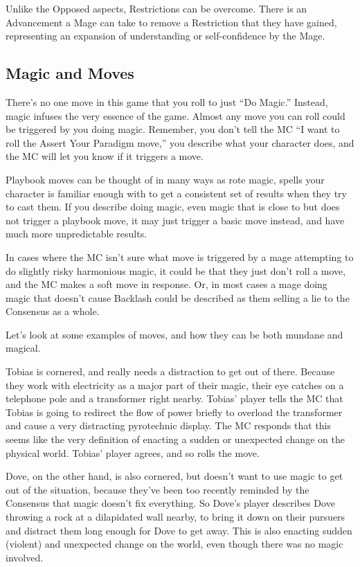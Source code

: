 \documentclass[
]{article}
\begin{document}
Unlike the Opposed aspects, Restrictions can be overcome. There is an
Advancement a Mage can take to remove a Restriction that they have
gained, representing an expansion of understanding or self-confidence by
the Mage.

\hypertarget{magic-and-moves}{%
\subsection{Magic and Moves}\label{magic-and-moves}}

There's no one move in this game that you roll to just ``Do Magic.''
Instead, magic infuses the very essence of the game. Almost any move you
can roll could be triggered by you doing magic. Remember, you don't tell
the MC ``I want to roll the Assert Your Paradigm move,'' you describe
what your character does, and the MC will let you know if it triggers a
move.

Playbook moves can be thought of in many ways as rote magic, spells your
character is familiar enough with to get a consistent set of results
when they try to cast them. If you describe doing magic, even magic that
is close to but does not trigger a playbook move, it may just trigger a
basic move instead, and have much more unpredictable results.

In cases where the MC isn't sure what move is triggered by a mage
attempting to do slightly risky harmonious magic, it could be that they
just don't roll a move, and the MC makes a soft move in response. Or, in
most cases a mage doing magic that doesn't cause Backlash could be
described as them selling a lie to the Consensus as a whole.

Let's look at some examples of moves, and how they can be both mundane
and magical.

Tobias is cornered, and really needs a distraction to get out of there.
Because they work with electricity as a major part of their magic, their
eye catches on a telephone pole and a transformer right nearby. Tobias'
player tells the MC that Tobias is going to redirect the flow of power
briefly to overload the transformer and cause a very distracting
pyrotechnic display. The MC responds that this seems like the very
definition of enacting a sudden or unexpected change on the physical
world. Tobias' player agrees, and so rolls the move.

Dove, on the other hand, is also cornered, but doesn't want to use magic
to get out of the situation, because they've been too recently reminded
by the Consensus that magic doesn't fix everything. So Dove's player
describes Dove throwing a rock at a dilapidated wall nearby, to bring it
down on their pursuers and distract them long enough for Dove to get
away. This is also enacting sudden (violent) and unexpected change on
the world, even though there was no magic involved.
\end{document}
